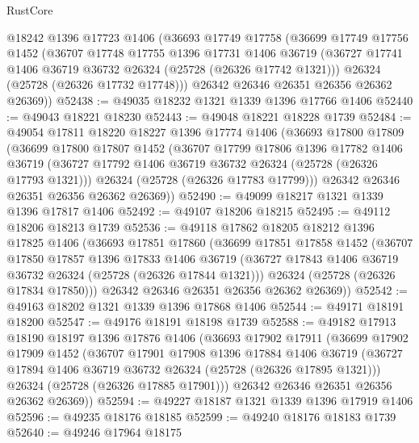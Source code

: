 \begin{lexlean}{RustCore}
\begin{coremodule}
    @18242
    @1396
    @17723
    @1406
    (@36693
      @17749
      @17758
      (@36699
        @17749
        @17756
        @1452
        (@36707
          @17748
          @17755
          @1396
          @17731
          @1406
          @36719
          (@36727 @17741 @1406 @36719 @36732 @26324 (@25728 (@26326 @17742 @1321)))
          @26324
          (@25728 (@26326 @17732 @17748)))
        @26342
        @26346
        @26351
        @26356
        @26362
        @26369))
@52438 := @49035 @18232 @1321 @1339 @1396 @17766 @1406
@52440 := @49043 @18221 @18230
@52443 := @49048 @18221 @18228 @1739
@52484 := @49054
    @17811
    @18220
    @18227
    @1396
    @17774
    @1406
    (@36693
      @17800
      @17809
      (@36699
        @17800
        @17807
        @1452
        (@36707
          @17799
          @17806
          @1396
          @17782
          @1406
          @36719
          (@36727 @17792 @1406 @36719 @36732 @26324 (@25728 (@26326 @17793 @1321)))
          @26324
          (@25728 (@26326 @17783 @17799)))
        @26342
        @26346
        @26351
        @26356
        @26362
        @26369))
@52490 := @49099 @18217 @1321 @1339 @1396 @17817 @1406
@52492 := @49107 @18206 @18215
@52495 := @49112 @18206 @18213 @1739
@52536 := @49118
    @17862
    @18205
    @18212
    @1396
    @17825
    @1406
    (@36693
      @17851
      @17860
      (@36699
        @17851
        @17858
        @1452
        (@36707
          @17850
          @17857
          @1396
          @17833
          @1406
          @36719
          (@36727 @17843 @1406 @36719 @36732 @26324 (@25728 (@26326 @17844 @1321)))
          @26324
          (@25728 (@26326 @17834 @17850)))
        @26342
        @26346
        @26351
        @26356
        @26362
        @26369))
@52542 := @49163 @18202 @1321 @1339 @1396 @17868 @1406
@52544 := @49171 @18191 @18200
@52547 := @49176 @18191 @18198 @1739
@52588 := @49182
    @17913
    @18190
    @18197
    @1396
    @17876
    @1406
    (@36693
      @17902
      @17911
      (@36699
        @17902
        @17909
        @1452
        (@36707
          @17901
          @17908
          @1396
          @17884
          @1406
          @36719
          (@36727 @17894 @1406 @36719 @36732 @26324 (@25728 (@26326 @17895 @1321)))
          @26324
          (@25728 (@26326 @17885 @17901)))
        @26342
        @26346
        @26351
        @26356
        @26362
        @26369))
@52594 := @49227 @18187 @1321 @1339 @1396 @17919 @1406
@52596 := @49235 @18176 @18185
@52599 := @49240 @18176 @18183 @1739
@52640 := @49246
    @17964
    @18175

\end{coremodule}
\end{lexlean}
